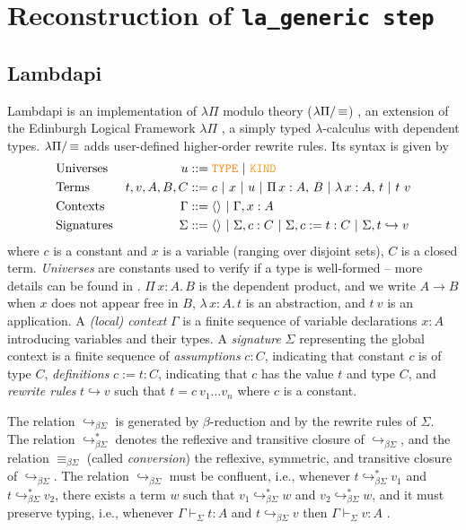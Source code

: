 \section{Reconstruction of \tt{la\_generic} step}
\label{sect:recon-lambdapi}

\subsection{Lambdapi}
\label{ssect:lambdapi}

Lambdapi is an implementation of $\lambda\Pi$ modulo theory ($\lambda\Pi/\mathop{\equiv}$) \cite{lambdapi}, an extension of the Edinburgh Logical Framework $\lambda\Pi$ \cite{lf}, a simply typed $\lambda$-calculus with dependent types. $\lambda\Pi/\mathop{\equiv}$ adds user-defined higher-order rewrite rules. Its syntax is given by
%
\begin{align*}
&\text{Universes}  &u &::= \type ~|~ \kind \\
&\text{Terms}   &t,v, A,B,C &::= c ~|~ x ~|~ u ~|~ \Pi\,x : A,\,B~|~ \lambda\,x : A,\,t ~|~t~v \\
&\text{Contexts}   &\Gamma &::= \langle \rangle ~|~ \Gamma, x : A \\
&\text{Signatures}  &\Sigma &::= \langle \rangle ~|~ \Sigma, c : C ~|~ \Sigma, c := t : C ~|~ \Sigma, t \hookrightarrow v 
\end{align*}
%
where $c$ is a constant and $x$ is a variable  (ranging over disjoint sets), $C$ is a closed term. \emph{Universes} are constants used to verify if a type is well-formed -- more details can be found in \cite[\S 2.1]{lf}. $\Pi\,x : A.\,B$ is the dependent product, and we write $A \rightarrow B$ when $x$ does not appear free in $B$, $\lambda\,x : A.\,t$ is an abstraction, and  $t~v$ is an application. A \emph{(local) context} $\Gamma$ is a finite sequence of variable declarations $x:A$ introducing variables and their types.
A \emph{signature} $\Sigma$ representing the global context is a finite sequence of \emph{assumptions} $c : C$, indicating that constant $c$ is of type $C$, \emph{definitions} $c := t : C$, indicating that $c$ has the value $t$ and type $C$, and \emph{rewrite rules} $t \hookrightarrow v$ such that $t = c~v_1 \dots v_n$ where $c$ is a constant.

The relation $\hookrightarrow_{\beta\Sigma}$ is generated by $\beta$-reduction and by the rewrite rules of $\Sigma$. The relation $\hookrightarrow_{\beta\Sigma}^*$ denotes the reflexive and transitive closure of $\hookrightarrow_{\beta\Sigma}$, and the relation $\equiv_{\beta\Sigma}$ (called \emph{conversion}) the reflexive, symmetric, and transitive closure of $\hookrightarrow_{\beta\Sigma}$. 
The relation $\hookrightarrow_{\beta\Sigma}$ must be confluent, i.e.,
whenever $t \hookrightarrow_{\beta\Sigma}^* v_1$ and $t \hookrightarrow_{\beta\Sigma}^* v_2$, there exists a term $w$ such that $v_1 \hookrightarrow_{\beta\Sigma}^* w$ and $v_2 \hookrightarrow_{\beta\Sigma}^* w$, and it must preserve typing, i.e., 
whenever $\Gamma \vdash_\Sigma t: A$ and $t \hookrightarrow_{\beta\Sigma} v$ then $\Gamma \vdash_\Sigma v: A$ \cite{blanqui:LIPIcs.FSCD.2020.13}.

